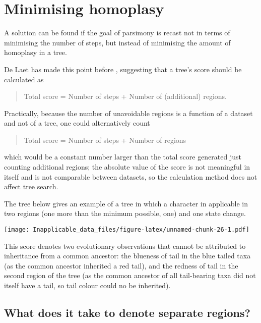 \documentclass[]{book}
\theoremstyle{definition}
\theoremstyle{definition}
\theoremstyle{definition}
\theoremstyle{remark}
\begin{document}
\hypertarget{minimising-homoplasy}{%
\section{Minimising homoplasy}\label{minimising-homoplasy}}

A solution can be found if the goal of parsimony is recast not in terms
of minimising the number of steps, but instead of minimising the amount
of homoplasy in a tree.

De Laet has made this point before
\citetext{\citealp{DeLaet2005}; \citeyear{DeLaet2015}}, suggesting that
a tree's score should be calculated as

\begin{quote}
Total score = Number of steps + Number of (additional) regions.
\end{quote}

Practically, because the number of unavoidable regions is a function of
a dataset and not of a tree, one could alternatively count

\begin{quote}
Total score = Number of steps + Number of regions
\end{quote}

which would be a constant number larger than the total score generated
just counting additional regions; the absolute value of the score is not
meaningful in itself and is not comparable between datasets, so the
calculation method does not affect tree search.

The tree below gives an example of a tree in which a character in
applicable in two regions (one more than the minimum possible, one) and
one state change.

\texttt{[image: Inapplicable\_data\_files/figure-latex/unnamed-chunk-26-1.pdf]}

This score denotes two evolutionary observations that cannot be
attributed to inheritance from a common ancestor: the blueness of tail
in the blue tailed taxa (as the common ancestor inherited a red tail),
and the redness of tail in the second region of the tree (as the common
ancestor of all tail-bearing taxa did not itself have a tail, so tail
colour could no be inherited).

\hypertarget{what-does-it-take-to-denote-separate-regions}{%
\subsection{What does it take to denote separate
regions?}\label{what-does-it-take-to-denote-separate-regions}}
\end{document}

